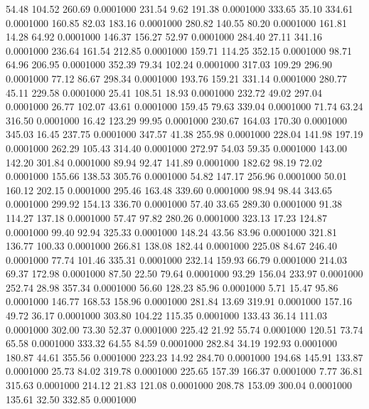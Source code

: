  54.48  104.52  260.69   0.0001000
 231.54    9.62  191.38   0.0001000
 333.65   35.10  334.61   0.0001000
 160.85   82.03  183.16   0.0001000
 280.82  140.55   80.20   0.0001000
 161.81   14.28   64.92   0.0001000
 146.37  156.27   52.97   0.0001000
 284.40   27.11  341.16   0.0001000
 236.64  161.54  212.85   0.0001000
 159.71  114.25  352.15   0.0001000
  98.71   64.96  206.95   0.0001000
 352.39   79.34  102.24   0.0001000
 317.03  109.29  296.90   0.0001000
  77.12   86.67  298.34   0.0001000
 193.76  159.21  331.14   0.0001000
 280.77   45.11  229.58   0.0001000
  25.41  108.51   18.93   0.0001000
 232.72   49.02  297.04   0.0001000
  26.77  102.07   43.61   0.0001000
 159.45   79.63  339.04   0.0001000
  71.74   63.24  316.50   0.0001000
  16.42  123.29   99.95   0.0001000
 230.67  164.03  170.30   0.0001000
 345.03   16.45  237.75   0.0001000
 347.57   41.38  255.98   0.0001000
 228.04  141.98  197.19   0.0001000
 262.29  105.43  314.40   0.0001000
 272.97   54.03   59.35   0.0001000
 143.00  142.20  301.84   0.0001000
  89.94   92.47  141.89   0.0001000
 182.62   98.19   72.02   0.0001000
 155.66  138.53  305.76   0.0001000
  54.82  147.17  256.96   0.0001000
  50.01  160.12  202.15   0.0001000
 295.46  163.48  339.60   0.0001000
  98.94   98.44  343.65   0.0001000
 299.92  154.13  336.70   0.0001000
  57.40   33.65  289.30   0.0001000
  91.38  114.27  137.18   0.0001000
  57.47   97.82  280.26   0.0001000
 323.13   17.23  124.87   0.0001000
  99.40   92.94  325.33   0.0001000
 148.24   43.56   83.96   0.0001000
 321.81  136.77  100.33   0.0001000
 266.81  138.08  182.44   0.0001000
 225.08   84.67  246.40   0.0001000
  77.74  101.46  335.31   0.0001000
 232.14  159.93   66.79   0.0001000
 214.03   69.37  172.98   0.0001000
  87.50   22.50   79.64   0.0001000
  93.29  156.04  233.97   0.0001000
 252.74   28.98  357.34   0.0001000
  56.60  128.23   85.96   0.0001000
   5.71   15.47   95.86   0.0001000
 146.77  168.53  158.96   0.0001000
 281.84   13.69  319.91   0.0001000
 157.16   49.72   36.17   0.0001000
 303.80  104.22  115.35   0.0001000
 133.43   36.14  111.03   0.0001000
 302.00   73.30   52.37   0.0001000
 225.42   21.92   55.74   0.0001000
 120.51   73.74   65.58   0.0001000
 333.32   64.55   84.59   0.0001000
 282.84   34.19  192.93   0.0001000
 180.87   44.61  355.56   0.0001000
 223.23   14.92  284.70   0.0001000
 194.68  145.91  133.87   0.0001000
  25.73   84.02  319.78   0.0001000
 225.65  157.39  166.37   0.0001000
   7.77   36.81  315.63   0.0001000
 214.12   21.83  121.08   0.0001000
 208.78  153.09  300.04   0.0001000
 135.61   32.50  332.85   0.0001000
